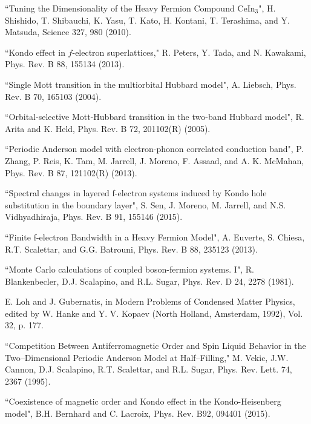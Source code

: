 \documentclass[pra,letterpaper,10pt,twocolumn]{revtex4}
\begin{document}
\begin{thebibliography}{100}
``Tuning the Dimensionality of the Heavy Fermion Compound CeIn$_3$",
H. Shishido, T. Shibauchi, K. Yasu, T. Kato, H. Kontani,
T. Terashima, and Y. Matsuda,
Science 327, 980 (2010).


``Kondo effect in $f$-electron superlattices,"
R. Peters, Y. Tada, and N. Kawakami,
Phys. Rev. B 88, 155134 (2013).

``Single Mott transition in the multiorbital Hubbard model",
A. Liebsch, Phys. Rev. B 70, 165103 (2004).

``Orbital-selective Mott-Hubbard transition in the two-band Hubbard model",
R. Arita and K. Held, Phys. Rev. B 72, 201102(R) (2005).

``Periodic Anderson model with electron-phonon correlated conduction band",
P. Zhang, P. Reis, K. Tam, M. Jarrell, J. Moreno, 
F. Assaad, and A. K. McMahan, Phys. Rev. B 87, 121102(R) (2013).

``Spectral changes in layered f-electron systems induced by Kondo hole substitution in the boundary layer",
S. Sen, J. Moreno, M. Jarrell, and N.S. Vidhyadhiraja, 
Phys. Rev. B 91, 155146 (2015).

``Finite f-electron Bandwidth in a Heavy Fermion Model",
A. Euverte, S. Chiesa, R.T. Scalettar, and G.G. Batrouni,
Phys. Rev. B 88, 235123 (2013).

``Monte Carlo calculations of coupled boson-fermion systems. I",
R. Blankenbecler, D.J. Scalapino, and R.L. Sugar, 
Phys. Rev. D 24, 2278 (1981).

E. Loh and J. Gubernatis, in Modern Problems of Condensed Matter 
Physics, edited by W. Hanke and Y. V. Kopaev (North Holland, 
Amsterdam, 1992), Vol. 32, p. 177.

``Competition Between Antiferromagnetic Order and Spin Liquid Behavior
in the Two--Dimensional Periodic Anderson Model at Half--Filling,"
M. Vekic, J.W. Cannon, D.J. Scalapino, R.T. Scalettar, 
and R.L. Sugar, Phys. Rev. Lett. 74, 2367 (1995).

``Coexistence of magnetic order and Kondo effect in the Kondo-Heisenberg
model",
B.H. Bernhard and C. Lacroix,
Phys. Rev. B92, 094401 (2015).


\end{thebibliography}
\end{document}

